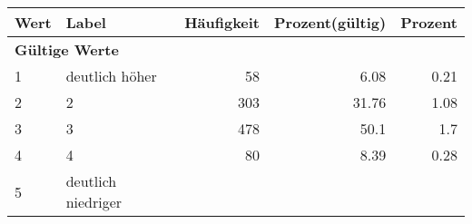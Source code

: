      \begin{longtable}{lXrrr}
     \toprule
     \textbf{Wert} & \textbf{Label} & \textbf{Häufigkeit} & \textbf{Prozent(gültig)} & \textbf{Prozent} \\
     \endhead
     \midrule
     \multicolumn{5}{l}{\textbf{Gültige Werte}}\\

     1 &
     \multicolumn{1}{X}{ deutlich höher   } &


       \num{58} &
       \num[round-mode=places,round-precision=2]{6,08} &
         \num[round-mode=places,round-precision=2]{0,21} \\

     2 &
     \multicolumn{1}{X}{ 2   } &


       \num{303} &
       \num[round-mode=places,round-precision=2]{31,76} &
         \num[round-mode=places,round-precision=2]{1,08} \\

     3 &
     \multicolumn{1}{X}{ 3   } &


       \num{478} &
       \num[round-mode=places,round-precision=2]{50,1} &
         \num[round-mode=places,round-precision=2]{1,7} \\

     4 &
     \multicolumn{1}{X}{ 4   } &


       \num{80} &
       \num[round-mode=places,round-precision=2]{8,39} &
         \num[round-mode=places,round-precision=2]{0,28} \\

     5 &
     \multicolumn{1}{X}{ deutlich niedriger   } &



\end{longtable}
